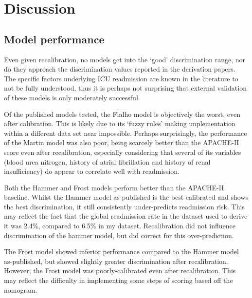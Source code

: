 \documentclass[onecolumn]{article}
\begin{document}
\section{Discussion}

\subsection{Model performance}

Even given recalibration, no models get into the `good' discrimination range, nor do they approach the discrimination values reported in the derivation papers. The specific factors underlying ICU readmission are known in the literature to not be fully understood, thus it is perhaps not surprising that external validation of these models is only moderately successful. 

Of the published models tested, the Fialho model is objectively the worst, even after calibration. This is likely due to its `fuzzy rules' making implementation within a different data set near impossible. Perhaps surprisingly, the performance of the Martin model was also poor, being scarcely better than the APACHE-II score even after recalibration, especially considering that several of its variables (blood urea nitrogen, history of atrial fibrillation and history of renal insufficiency) do appear to correlate well with readmission.

Both the Hammer and Frost models perform better than the APACHE-II baseline. Whilst the Hammer model as-published is the best calibrated and shows the best discrimination, it still consistently under-predicts readmission risk. This may reflect the fact that the global readmission rate in the dataset used to derive it was 2.4\%, compared to 6.5\% in my dataset. Recalibration did not influence discrimination of the hammer model, but did correct for this over-prediction. 

The Frost model showed inferior performance compared to the Hammer model as-published, but showed slightly greater discrimination after recalibration. However, the Frost model was poorly-calibrated even after recalibration. This may reflect the difficulty in implementing some steps of scoring based off the nomogram.
\end{document}
